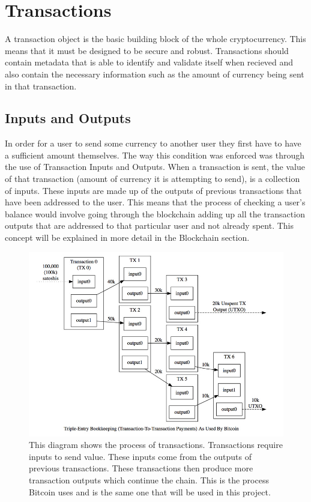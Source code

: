 \documentclass{l4proj}
\begin{document}

\section{Transactions}
A transaction object is the basic building block of the whole cryptocurrency. This means that it must be designed 
to be secure and robust. Transactions should contain metadata that is able to identify and validate itself when
recieved and also contain the necessary information such as the amount of currency being sent in that transaction.

\subsection{Inputs and Outputs}
In order for a user to send some currency to another user they first have to have a sufficient amount themselves. The
way this condition was enforced was through the use of Transaction Inputs and Outputs. When a transaction is
sent, the value of that transaction (amount of currency it is attempting to send), is a collection of inputs. These inputs
are made up of the outputs of previous transactions that have been addressed to the user. This means that the process of
checking a user's balance would involve going through the blockchain adding up all the transaction outputs that
are addressed to that particular user and not already spent. This concept will be explained in more detail in the Blockchain section.

\begin{figure}[!ht]
    \centering
    \includegraphics[width=1\linewidth]{images/utxo-model.jpg}    

    \caption{
        This diagram shows the process of transactions. Transactions require inputs to send value. These inputs come from
        the outputs of previous transactions. These transactions then produce more transaction outputs which continue
        the chain. This is the process Bitcoin uses and is the same one that will be used in this project.
    }

    \label{fig:transaction} 
\end{figure}
\end{document}
